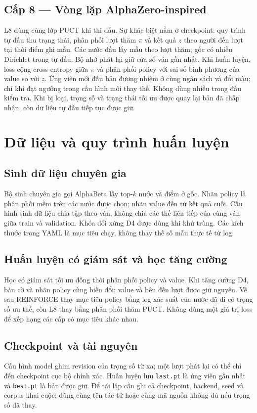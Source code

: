 \subsection{Cấp 8 --- Vòng lặp AlphaZero-inspired}
L8 dùng cùng lớp PUCT khi thi đấu. Sự khác biệt nằm ở checkpoint: quy trình tự đấu thu trạng thái, phân phối lượt thăm $\pi$ và kết quả $z$ theo người đến lượt tại thời điểm ghi mẫu. Các nước đầu lấy mẫu theo lượt thăm; gốc có nhiễu Dirichlet trong tự đấu. Bộ nhớ phát lại giữ cửa sổ ván gần nhất. Khi huấn luyện, loss cộng cross-entropy giữa $\pi$ và phân phối policy với sai số bình phương của value so với $z$. Ứng viên mới đấu bản đương nhiệm ở cùng ngân sách và đổi màu; chỉ khi đạt ngưỡng trong cấu hình mới thay thế. Không dùng nhiễu trong đấu kiểm tra. Khi bị loại, trọng số và trạng thái tối ưu được quay lại bản đã chấp nhận, còn dữ liệu tự đấu tiếp tục được giữ.

\section{Dữ liệu và quy trình huấn luyện}
\subsection{Sinh dữ liệu chuyên gia}
Bộ sinh chuyên gia gọi AlphaBeta lấy top-$k$ nước và điểm ở gốc. Nhãn policy là phân phối mềm trên các nước được chọn; nhãn value đến từ kết quả cuối. Cấu hình sinh dữ liệu chia tập theo ván, không chia các thế liên tiếp của cùng ván giữa train và validation. Khóa đối xứng D4 được dùng khi khử trùng. Các kích thước trong YAML là mục tiêu chạy, không thay thế số mẫu thực tế từ log.
\subsection{Huấn luyện có giám sát và học tăng cường}
Học có giám sát tối ưu đồng thời phân phối policy và value. Khi tăng cường D4, bàn cờ và nhãn policy cùng biến đổi; value và bên đến lượt được giữ nguyên. Về sau REINFORCE thay mục tiêu policy bằng log-xác suất của nước đã đi có trọng số ưu thế, còn L8 thay bằng phân phối thăm PUCT. Không dùng một giá trị loss để xếp hạng các cấp có mục tiêu khác nhau.
\subsection{Checkpoint và tài nguyên}
Cấu hình model ghim revision của trọng số từ xa; một lượt phát lại có thể chỉ đến checkpoint cục bộ chính xác. Huấn luyện lưu \texttt{last.pt} là ứng viên gần nhất và \texttt{best.pt} là bản được giữ. Để tái lập cần ghi cả checkpoint, backend, seed và corpus khai cuộc; dùng cùng tên tác tử hoặc cùng mã nguồn không đủ nếu trọng số đã thay.

